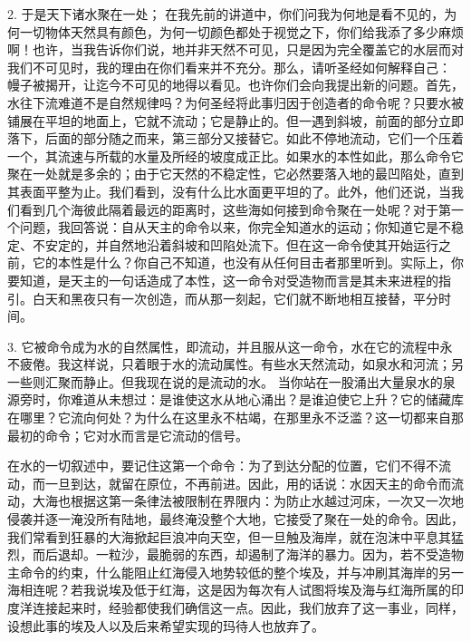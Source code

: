 2.  于是天下诸水聚在一处；  在我先前的讲道中，你们问我为何地是看不见的，为何一切物体天然具有颜色，为何一切颜色都处于视觉之下，你们给我添了多少麻烦啊！也许，当我告诉你们说，地并非天然不可见，只是因为完全覆盖它的水层而对我们不可见时，我的理由在你们看来并不充分。那么，请听圣经如何解释自己： 幔子被揭开，让迄今不可见的地得以看见。也许你们会向我提出新的问题。首先，水往下流难道不是自然规律吗？为何圣经将此事归因于创造者的命令呢？只要水被铺展在平坦的地面上，它就不流动；它是静止的。但一遇到斜坡，前面的部分立即落下，后面的部分随之而来，第三部分又接替它。如此不停地流动，它们一个压着一个，其流速与所载的水量及所经的坡度成正比。如果水的本性如此，那么命令它聚在一处就是多余的；由于它天然的不稳定性，它必然要落入地的最凹陷处，直到其表面平整为止。我们看到，没有什么比水面更平坦的了。此外，他们还说，当我们看到几个海彼此隔着最远的距离时，这些海如何接到命令聚在一处呢？对于第一个问题，我回答说：自从天主的命令以来，你完全知道水的运动；你知道它是不稳定、不安定的，并自然地沿着斜坡和凹陷处流下。但在这一命令使其开始运行之前，它的本性是什么？你自己不知道，也没有从任何目击者那里听到。实际上，你要知道，是天主的一句话造成了本性，这一命令对受造物而言是其未来进程的指引。白天和黑夜只有一次创造，而从那一刻起，它们就不断地相互接替，平分时间。\par

3.  它被命令成为水的自然属性，即流动，并且服从这一命令，水在它的流程中永不疲倦。我这样说，只着眼于水的流动属性。有些水天然流动，如泉水和河流；另一些则汇聚而静止。但我现在说的是流动的水。 当你站在一股涌出大量泉水的泉源旁时，你难道从未想过：是谁使这水从地心涌出？是谁迫使它上升？它的储藏库在哪里？它流向何处？为什么在这里永不枯竭，在那里永不泛滥？这一切都来自那最初的命令；它对水而言是它流动的信号。\par

在水的一切叙述中，要记住这第一个命令：为了到达分配的位置，它们不得不流动，而一旦到达，就留在原位，不再前进。因此，用的话说：水因天主的命令而流动，大海也根据这第一条律法被限制在界限内：为防止水越过河床，一次又一次地侵袭并逐一淹没所有陆地，最终淹没整个大地，它接受了聚在一处的命令。因此，我们常看到狂暴的大海掀起巨浪冲向天空，但一旦触及海岸，就在泡沫中平息其猛烈，而后退却。一粒沙，最脆弱的东西，却遏制了海洋的暴力。因为，若不受造物主命令的约束，什么能阻止红海侵入地势较低的整个埃及，并与冲刷其海岸的另一海相连呢？若我说埃及低于红海，这是因为每次有人试图将埃及海与红海所属的印度洋连接起来时，经验都使我们确信这一点。因此，我们放弃了这一事业，同样，设想此事的埃及人以及后来希望实现的玛待人也放弃了。\par

